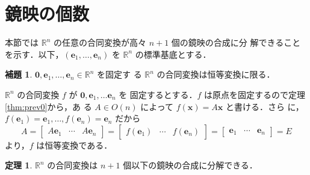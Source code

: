 \documentclass[11pt, uplatex, dvipdfmx, titlepage]{jsarticle}
\makeatletter
\renewenvironment{proof}[1][\proofname]{\par
  \pushQED{\qed}%
  \normalfont \topsep6\p@\@plus6\p@\relax
  \trivlist
  \item[\hskip\labelsep
         \bfseries
    {#1}]\ignorespaces
}{%
  \popQED\endtrivlist\@endpefalse
}
\theoremstyle{definition}
\newtheorem{theorem}{定理}[section]
\newtheorem{lemma}{補題}[section]
\renewcommand{\proofname}{\textbf{証明}}
\makeatother
\begin{document}
\newpage

\section{鏡映の個数}\label{sec:n+1-reflection}

本節では $\mathbb{R}^n$ の任意の合同変換が高々 $n+1$ 個の鏡映の合成に分
解できることを示す．以下，$(\bm{e}_1, \ldots, \bm{e}_n)
$ を $\mathbb{R}^n$ の標準基底とする．

\begin{lemma}\label{lem:0id}
  $\bm{0}, \bm{e}_1, \ldots, \bm{e}_n \in \mathbb{R}^n$ を固定す
  る $\mathbb{R}^n$ の合同変換は恒等変換に限る．
\end{lemma}

\begin{proof}
  $\mathbb{R}^n$ の合同変換 $f$ が $\bm{0}, \bm{e}_1, \ldots \bm{e}_n$ を
  固定するとする．$f$ は原点を固定するので定理\ref{thm:prev0}から，あ
  る $A \in O(n)$ によって $f(\bm{x}) = A\bm{x}$ と書ける．さら
  に，$f(\bm{e}_1) = \bm{e}_1, \ldots, f(\bm{e}_n) = \bm{e}_n$ だから
  \[
    A=\left[
     \begin{array}{ccc}
       A\bm{e}_1 & \cdots & A\bm{e}_n
     \end{array}
   \right]=\left[
     \begin{array}{ccc}
       f(\bm{e}_1) & \cdots & f(\bm{e}_n)
     \end{array}
   \right]=\left[
      \begin{array}{ccc}
        \bm{e}_1 & \cdots & \bm{e}_n
      \end{array}
    \right] =E
  \]
  より，$f$ は恒等変換である．
\end{proof}

\begin{theorem}
  $\mathbb{R}^n$ の合同変換は $n+1$ 個以下の鏡映の合成に分解できる．
\end{theorem}
\end{document}
